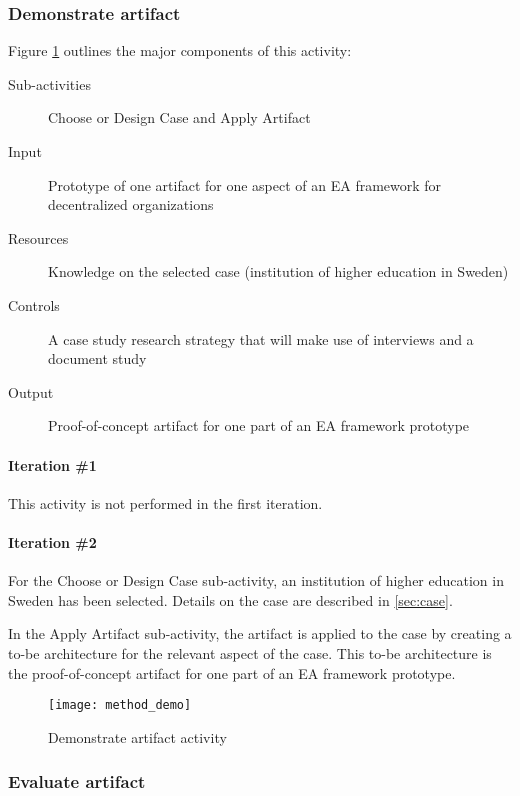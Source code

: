 \subsubsection*{Demonstrate artifact}

Figure \ref{fig:method_demo} outlines the major components of this activity:
\begin{description}
  \item[Sub-activities]  Choose or Design Case and Apply Artifact~\cite[Ch. 8]{johannessonPerjons2012}
  \item[Input] Prototype of one artifact for one aspect of an EA framework for decentralized organizations
  \item[Resources]  Knowledge on the selected case (institution of higher education in Sweden)
  \item[Controls]  A case study research strategy that will make use of interviews and a document study
  \item[Output] Proof-of-concept artifact for one part of an EA framework prototype
\end{description}

\paragraph{Iteration \#1}

This activity is not performed in the first iteration. 

\paragraph{Iteration \#2}
For the Choose or Design Case sub-activity, an institution of higher education in Sweden has been selected. Details on the case are described in \ref{sec:case}.

In the Apply Artifact sub-activity, the artifact is applied to the case by creating a to-be architecture for the relevant aspect of the case. This to-be architecture is the proof-of-concept artifact for one part of an EA framework prototype.

\begin{figure}
\texttt{[image: method\_demo]}
\caption{Demonstrate artifact activity}
\label{fig:method_demo}
\end{figure}

\subsubsection*{Evaluate artifact}

